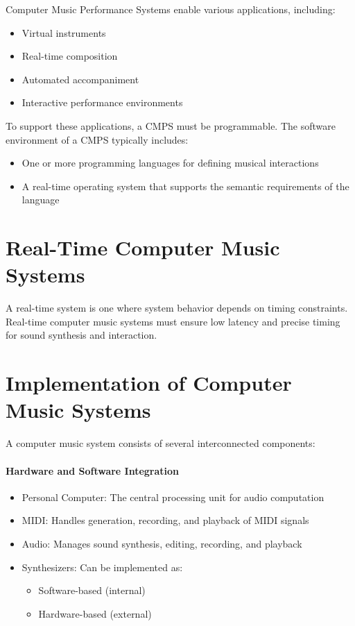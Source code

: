 Computer Music Performance Systems enable various applications, including:

\begin{itemize}
    \item Virtual instruments
    \item Real-time composition
    \item Automated accompaniment
    \item Interactive performance environments
\end{itemize}

To support these applications, a CMPS must be programmable. The software environment of a CMPS typically includes:

\begin{itemize}
    \item One or more programming languages for defining musical interactions
    \item A real-time operating system that supports the semantic requirements of the language
\end{itemize}

\section{Real-Time Computer Music Systems}

A real-time system is one where system behavior depends on timing constraints. Real-time computer music systems must ensure low latency and precise timing for sound synthesis and interaction.

\section{Implementation of Computer Music Systems}

A computer music system consists of several interconnected components:

\paragraph{Hardware and Software Integration}

\begin{itemize}
    \item Personal Computer: The central processing unit for audio computation
    \item MIDI: Handles generation, recording, and playback of MIDI signals
    \item Audio: Manages sound synthesis, editing, recording, and playback
    \item Synthesizers: Can be implemented as:
    \begin{itemize}
        \item Software-based (internal)
        \item Hardware-based (external)
    \end{itemize}
\end{itemize}

